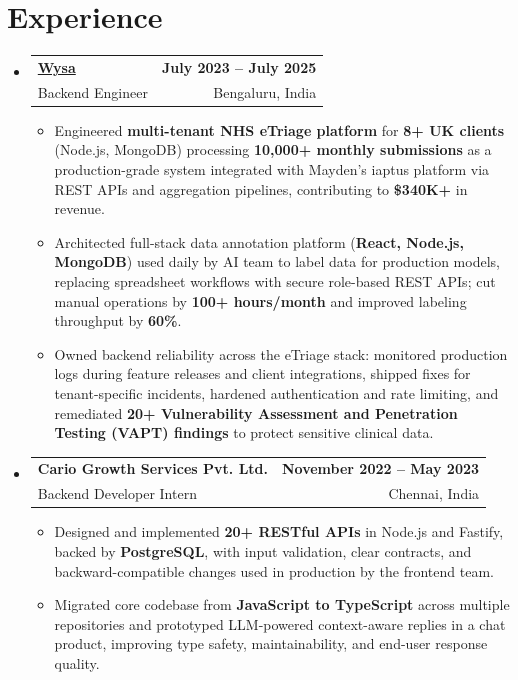 \documentclass[letterpaper,10pt]{article}
\makeatletter
\newcommand{\resumeItem}[1]{
  \item\small{#1\vspace{-1pt}}
}
\newcommand{\resumeSubheading}[4]{
  \vspace{1pt}\item
    \begin{tabular*}{0.985\textwidth}[t]{l@{\extracolsep{\fill}}r}
      \textbf{#1} & \textbf{\small #2} \\
      {\small\color{ResumeSlate} #3} & {\small\color{ResumeSlate} #4} \\
    \end{tabular*}\vspace{-6pt}
}
\newcommand{\resumeSubHeadingListStart}{\begin{itemize}[leftmargin=0.0in, label={}, itemsep=2pt, topsep=2pt]}
\newcommand{\resumeSubHeadingListEnd}{\end{itemize}}
\newcommand{\resumeItemListStart}{\begin{itemize}[leftmargin=0.18in, itemsep=2pt, topsep=1pt]}
\newcommand{\resumeItemListEnd}{\end{itemize}\vspace{-4pt}}
\makeatother
\begin{document}
\section{Experience}
\resumeSubHeadingListStart
  \resumeSubheading
    {\href{https://www.wysa.io}{Wysa}}{July 2023 -- July 2025}
    {Backend Engineer}{Bengaluru, India}
    \resumeItemListStart
      \resumeItem{Engineered \textbf{multi-tenant NHS eTriage platform} for \textbf{8+ UK clients} (Node.js, MongoDB) processing \textbf{10{,}000+ monthly submissions} as a production-grade system integrated with Mayden's iaptus platform via REST APIs and aggregation pipelines, contributing to \textbf{\$340K+} in revenue.}
      \resumeItem{Architected full-stack data annotation platform (\textbf{React, Node.js, MongoDB}) used daily by AI team to label data for production models, replacing spreadsheet workflows with secure role-based REST APIs; cut manual operations by \textbf{100+ hours/month} and improved labeling throughput by \textbf{60\%}.}
      \resumeItem{Owned backend reliability across the eTriage stack: monitored production logs during feature releases and client integrations, shipped fixes for tenant-specific incidents, hardened authentication and rate limiting, and remediated \textbf{20+ Vulnerability Assessment and Penetration Testing (VAPT) findings} to protect sensitive clinical data.}
    \resumeItemListEnd
  \resumeSubheading
    {Cario Growth Services Pvt. Ltd.}{November 2022 -- May 2023}
    {Backend Developer Intern}{Chennai, India}
    \resumeItemListStart
      \resumeItem{Designed and implemented \textbf{20+ RESTful APIs} in Node.js and Fastify, backed by \textbf{PostgreSQL}, with input validation, clear contracts, and backward-compatible changes used in production by the frontend team.}
      \resumeItem{Migrated core codebase from \textbf{JavaScript to TypeScript} across multiple repositories and prototyped LLM-powered context-aware replies in a chat product, improving type safety, maintainability, and end-user response quality.}
    \resumeItemListEnd
\resumeSubHeadingListEnd
\vspace{-4pt}
\end{document}
